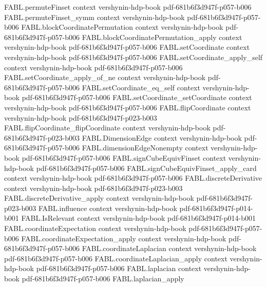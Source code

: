 \begin{theorem}
  {FABL.permuteFinset}
  {context}
  {vershynin-hdp-book}
  {pdf-681b6f3d947f-p057-b006}
\proofstep
  {FABL.permuteFinset_symm}
  {context}
  {vershynin-hdp-book}
  {pdf-681b6f3d947f-p057-b006}
\proofstep
  {FABL.blockCoordinatePermutation}
  {context}
  {vershynin-hdp-book}
  {pdf-681b6f3d947f-p057-b006}
\proofstep
  {FABL.blockCoordinatePermutation_apply}
  {context}
  {vershynin-hdp-book}
  {pdf-681b6f3d947f-p057-b006}
\proofstep
  {FABL.setCoordinate}
  {context}
  {vershynin-hdp-book}
  {pdf-681b6f3d947f-p057-b006}
\proofstep
  {FABL.setCoordinate_apply_self}
  {context}
  {vershynin-hdp-book}
  {pdf-681b6f3d947f-p057-b006}
\proofstep
  {FABL.setCoordinate_apply_of_ne}
  {context}
  {vershynin-hdp-book}
  {pdf-681b6f3d947f-p057-b006}
\proofstep
  {FABL.setCoordinate_eq_self}
  {context}
  {vershynin-hdp-book}
  {pdf-681b6f3d947f-p057-b006}
\proofstep
  {FABL.setCoordinate_setCoordinate}
  {context}
  {vershynin-hdp-book}
  {pdf-681b6f3d947f-p057-b006}
\proofstep
  {FABL.flipCoordinate}
  {context}
  {vershynin-hdp-book}
  {pdf-681b6f3d947f-p023-b003}
\proofstep
  {FABL.flipCoordinate_flipCoordinate}
  {context}
  {vershynin-hdp-book}
  {pdf-681b6f3d947f-p023-b003}
\proofstep
  {FABL.DimensionEdge}
  {context}
  {vershynin-hdp-book}
  {pdf-681b6f3d947f-p057-b006}
\proofstep
  {FABL.dimensionEdgeNonempty}
  {context}
  {vershynin-hdp-book}
  {pdf-681b6f3d947f-p057-b006}
\proofstep
  {FABL.signCubeEquivFinset}
  {context}
  {vershynin-hdp-book}
  {pdf-681b6f3d947f-p057-b006}
\proofstep
  {FABL.signCubeEquivFinset_apply_card}
  {context}
  {vershynin-hdp-book}
  {pdf-681b6f3d947f-p057-b006}
\proofstep
  {FABL.discreteDerivative}
  {context}
  {vershynin-hdp-book}
  {pdf-681b6f3d947f-p023-b003}
\proofstep
  {FABL.discreteDerivative_apply}
  {context}
  {vershynin-hdp-book}
  {pdf-681b6f3d947f-p023-b003}
\proofstep
  {FABL.influence}
  {context}
  {vershynin-hdp-book}
  {pdf-681b6f3d947f-p014-b001}
\proofstep
  {FABL.IsRelevant}
  {context}
  {vershynin-hdp-book}
  {pdf-681b6f3d947f-p014-b001}
\proofstep
  {FABL.coordinateExpectation}
  {context}
  {vershynin-hdp-book}
  {pdf-681b6f3d947f-p057-b006}
\proofstep
  {FABL.coordinateExpectation_apply}
  {context}
  {vershynin-hdp-book}
  {pdf-681b6f3d947f-p057-b006}
\proofstep
  {FABL.coordinateLaplacian}
  {context}
  {vershynin-hdp-book}
  {pdf-681b6f3d947f-p057-b006}
\proofstep
  {FABL.coordinateLaplacian_apply}
  {context}
  {vershynin-hdp-book}
  {pdf-681b6f3d947f-p057-b006}
\proofstep
  {FABL.laplacian}
  {context}
  {vershynin-hdp-book}
  {pdf-681b6f3d947f-p057-b006}
\proofstep
  {FABL.laplacian_apply}

\end{theorem}
